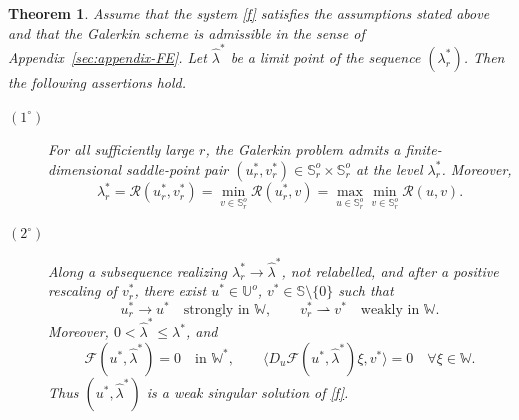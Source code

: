 \documentclass[preprint,10pt]{elsarticle}
\numberwithin{equation}{section}
\newtheorem{thm}{Theorem}[section]
\begin{document}
\begin{thm}\label{Thm42} 
	Assume that the system \eqref{f} satisfies the assumptions stated above and
	that the Galerkin scheme is admissible in the sense of
	Appendix~\ref{sec:appendix-FE}. Let \(\hat\lambda^*\) be a limit point of
	the sequence \((\lambda_r^*)\). Then the following assertions hold.
	
	\begin{description}
		\item[\((1^\circ)\)]
		For all sufficiently large \(r\), the Galerkin problem admits a
		finite-dimensional saddle-point pair
		\((u_r^*,v_r^*)\in\mathbb S_r^o\times\mathbb S_r^o\) at the level
		\(\lambda_r^*\). Moreover,
		\[
		\lambda_r^*
		=
		\mathcal R(u_r^*,v_r^*)
		=
		\min_{v\in\mathbb S_r^o}\mathcal R(u_r^*,v)
		=
		\max_{u\in\mathbb S_r^o}
		\min_{v\in\mathbb S_r^o}\mathcal R(u,v).
		\]
		
		\item[\((2^\circ)\)]
		Along a subsequence realizing \(\lambda_r^*\to\hat\lambda^*\),
		not relabelled, and after a positive rescaling of \(v_r^*\), there
		exist \(u^*\in\mathbb U^o\), \(v^*\in\mathbb S\setminus\{0\}\)
		such that
		\[
		u_r^*\to u^* \quad\text{strongly in }\mathbb W,
		\qquad
		v_r^*\rightharpoonup v^* \quad\text{weakly in }\mathbb W .
		\]
		Moreover, \(0<\hat\lambda^*\le\lambda^*\), and
		\[
		\mathcal F(u^*,\hat\lambda^*)=0
		\quad\text{in }\mathbb W^*,
		\qquad
		\bigl\langle
		D_u\mathcal F(u^*,\hat\lambda^*)\xi,v^*
		\bigr\rangle=0
		\quad \forall \xi\in\mathbb W .
		\]
		Thus \((u^*,\hat\lambda^*)\) is a weak singular solution of
		\eqref{f}.
	\end{description}
\end{thm}
\end{document}
